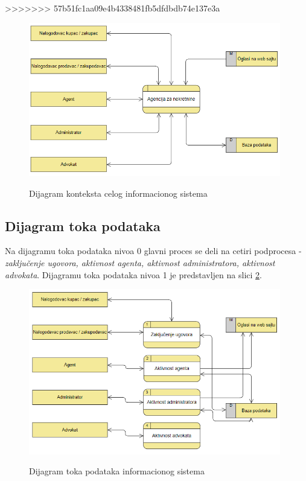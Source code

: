\documentclass{article}
\begin{document}
>>>>>>> 57b51fc1aa09e4b4338481fb5dfdbdb74e137e3a
\begin{figure}[h]
		\centering
		\includegraphics[width=0.98\textwidth,height=0.5\textheight]{Pictures/DijagramKontekstaCelogSistema}\\
		\caption{Dijagram konteksta celog informacionog sistema}
		\label{fig:dijagramKontekstaCelogIS}
	\end{figure}

\newpage
\subsection{\bfseries Dijagram toka podataka}

Na dijagramu toka podataka nivoa 0 glavni proces se deli na cetiri podprocesa - {\it zaključenje ugovora, aktivnost agenta, aktivnost administratora, aktivnost advokata}.
Dijagramu toka podataka nivoa 1 je predstavljen na slici \ref{fig:dijagramTokaPodatakaIS}. 

\begin{figure}[h]
		\centering
		\includegraphics[width=0.98\textwidth,height=0.5\textheight]{Pictures/DijagramTokaPodataka}\\
		\caption{Dijagram toka podataka informacionog sistema}
		\label{fig:dijagramTokaPodatakaIS}
	\end{figure}
\end{document}
